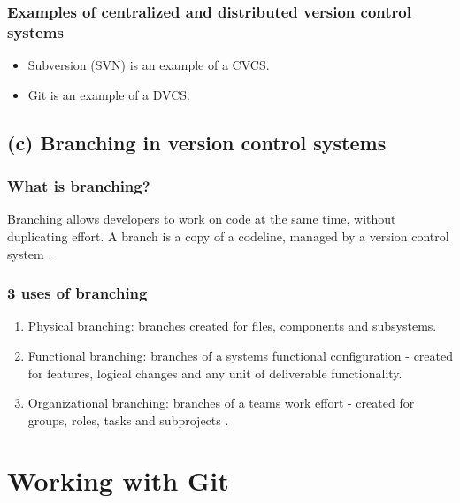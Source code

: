 \documentclass{article}
\begin{document}
\subsubsection{Examples of centralized and distributed version control systems}
\begin{itemize}
	\item Subversion (SVN) is an example of a CVCS.
	\item Git is an example of a DVCS.
\end{itemize}
\subsection{(c) Branching in version control systems}
\subsubsection{What is branching?}
\begin{flushleft}
	Branching allows developers to work on code at the same time, without duplicating effort. A branch is a copy of a codeline, managed by a version control system \cite{zolkifli2018version}.
\end{flushleft}
\subsubsection{3 uses of branching}
\begin{enumerate}
	\item Physical branching: branches created for files, components and subsystems.
	\item Functional branching: branches of a systems functional configuration - created for features, logical changes and any unit of deliverable functionality.
	\item Organizational branching: branches of a teams work effort - created for groups, roles, tasks and subprojects \cite{appleton1998streamed}.
\end{enumerate}
\section{Working with Git}
\end{document}
